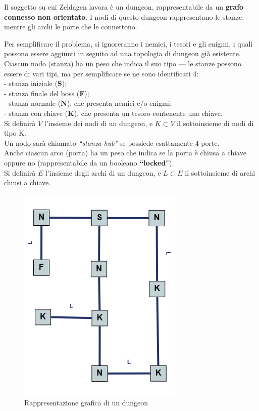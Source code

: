 \documentclass[12pt,titlepage]{article}
\begin{document}
Il soggetto su cui Zeldagen lavora è un dungeon, rappresentabile da un \textbf{grafo connesso non orientato}.
I nodi di questo dungeon rappresentano le stanze, mentre gli archi le porte che le connettono.

Per semplificare il problema, si ignoreranno i nemici, i tesori e gli enigmi, i quali possono essere aggiunti in seguito ad una topologia di dungeon già esistente.\\

\noindent Ciascun nodo (stanza) ha un peso che indica il suo tipo --- le stanze possono essere di vari tipi, ma per semplificare se ne sono identificati 4:\\
- stanza iniziale (\textbf{S});\\
- stanza finale del boss (\textbf{F});\\
- stanza normale (\textbf{N}), che presenta nemici e/o enigmi;\\
- stanza con chiave (\textbf{K}), che presenta un tesoro contenente una chiave.\\
Si definirà $V$ l'insieme dei nodi di un dungeon, e $K \subset V$ il sottoinsieme di nodi di tipo K.\\
Un nodo sarà chiamato \textit{``stanza hub"} se possiede esattamente 4 porte.\\

\noindent Anche ciascun arco (porta) ha un peso che indica se la porta è chiusa a chiave oppure no (rappresentabile da un booleano \textbf{``locked"}).\\
Si definirà $E$ l'insieme degli archi di un dungeon, e $L \subset E$ il sottoinsieme di archi chiusi a chiave.\\

\begin{figure}[H]
    \centering
    \includegraphics[width=0.33\linewidth]{assets/dungeon-graph-example.png}
    \caption{Rappresentazione grafica di un dungeon}
\end{figure}
\end{document}
